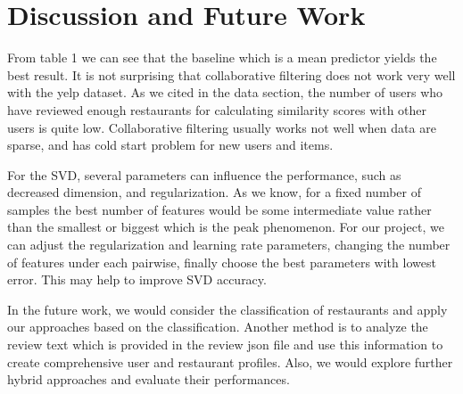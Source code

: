 \documentclass{llncs}
\begin{document}
\section{Discussion and Future Work}
From table 1 we can see that the baseline which is a mean predictor yields the best result. It is not surprising that collaborative filtering does not work very well with the yelp dataset. As we cited in the data section, the number of users who have reviewed enough restaurants for calculating similarity scores with other users is quite low. Collaborative filtering usually works not well when data are sparse, and has cold start problem for new users and items.

For the SVD, several parameters can influence the performance, such as decreased dimension, and regularization. As we know, for a fixed number of samples the best number of features would be some intermediate value rather than the smallest or biggest which is the peak phenomenon. For our project, we can adjust the regularization and learning rate parameters, changing the number of features under each pairwise, finally choose the best parameters with lowest error. This may help to improve SVD accuracy.
 
 In the future work, we would consider the classification of restaurants and apply our approaches based on the classification. Another method is to analyze the review text which is provided in the review json file and use this information to create comprehensive user and restaurant profiles. Also, we would explore further hybrid approaches and evaluate their performances.
\end{document}

